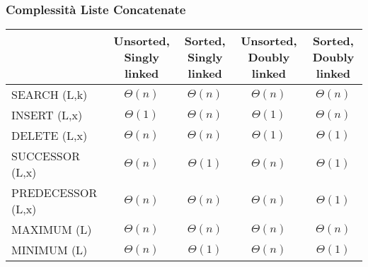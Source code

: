 
\subsubsection{Complessità Liste Concatenate}

\begin{tabular}{|l|c|c|c|c|}
\hline
 & \shortstack{Unsorted, \\ Singly linked} & \shortstack{Sorted, \\ Singly linked} & \shortstack{Unsorted, \\ Doubly linked} & \shortstack{Sorted, \\ Doubly linked} \\
\hline
SEARCH (L,k) & $\Theta(n)$ & $\Theta(n)$ & $\Theta(n)$ & $\Theta(n)$ \\
\hline
INSERT (L,x) & $\Theta(1)$ & $\Theta(n)$ & $\Theta(1)$ & $\Theta(n)$ \\
\hline
DELETE (L,x) & $\Theta(n)$ & $\Theta(n)$ & $\Theta(1)$ & $\Theta(1)$ \\
\hline
SUCCESSOR (L,x) & $\Theta(n)$ & $\Theta(1)$ & $\Theta(n)$ & $\Theta(1)$ \\
\hline
PREDECESSOR (L,x) & $\Theta(n)$ & $\Theta(n)$ & $\Theta(n)$ & $\Theta(1)$ \\
\hline
MAXIMUM (L) & $\Theta(n)$ & $\Theta(n)$ & $\Theta(n)$ & $\Theta(n)$ \\
\hline
MINIMUM (L) & $\Theta(n)$ & $\Theta(1)$ & $\Theta(n)$ & $\Theta(1)$ \\
\hline
\end{tabular}